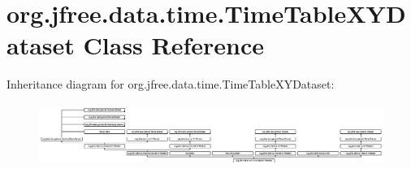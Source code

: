 \hypertarget{classorg_1_1jfree_1_1data_1_1time_1_1_time_table_x_y_dataset}{}\section{org.\+jfree.\+data.\+time.\+Time\+Table\+X\+Y\+Dataset Class Reference}
\label{classorg_1_1jfree_1_1data_1_1time_1_1_time_table_x_y_dataset}
Inheritance diagram for org.\+jfree.\+data.\+time.\+Time\+Table\+X\+Y\+Dataset\+:\begin{figure}[H]
\begin{center}
\leavevmode
\includegraphics[height=2.051282cm]{classorg_1_1jfree_1_1data_1_1time_1_1_time_table_x_y_dataset}
\end{center}
\end{figure}

